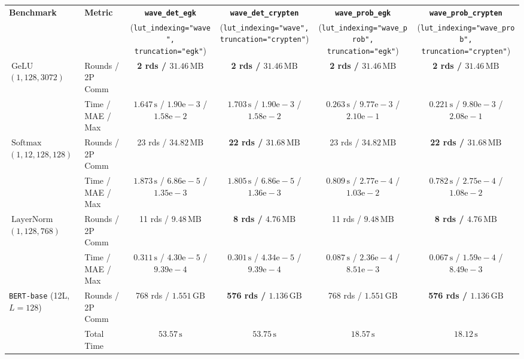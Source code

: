 \begin{tabular}{@{}llcccc@{}}
\toprule
\textbf{Benchmark} & \textbf{Metric} & \textbf{\texttt{wave\_det\_egk}} & \textbf{\texttt{wave\_det\_crypten}} & \textbf{\texttt{wave\_prob\_egk}} & \textbf{\texttt{wave\_prob\_crypten}} \\
 & & (\texttt{lut\_indexing="wave", truncation="egk"}) & (\texttt{lut\_indexing="wave", truncation="crypten"}) & (\texttt{lut\_indexing="wave\_prob", truncation="egk"}) & (\texttt{lut\_indexing="wave\_prob", truncation="crypten"}) \\
\midrule
\multirow{2}{*}{$\operatorname{GeLU}$ $(1, 128, 3072)$}
 & Rounds / 2P Comm & \textbf{2 rds / $31.46\,\text{MB}$} & \textbf{2 rds / $31.46\,\text{MB}$} & \textbf{2 rds / $31.46\,\text{MB}$} & \textbf{2 rds / $31.46\,\text{MB}$} \\
 & Time / MAE / Max & $1.647\,\text{s}$ / $1.90\text{e}-3$ / $1.58\text{e}-2$ & $1.703\,\text{s}$ / $1.90\text{e}-3$ / $1.58\text{e}-2$ & $0.263\,\text{s}$ / $9.77\text{e}-3$ / $2.10\text{e}-1$ & $0.221\,\text{s}$ / $9.80\text{e}-3$ / $2.08\text{e}-1$ \\
\midrule
\multirow{2}{*}{$\operatorname{Softmax}$ $(1, 12, 128, 128)$}
 & Rounds / 2P Comm & 23 rds / $34.82\,\text{MB}$ & \textbf{22 rds / $31.68\,\text{MB}$} & 23 rds / $34.82\,\text{MB}$ & \textbf{22 rds / $31.68\,\text{MB}$} \\
 & Time / MAE / Max & $1.873\,\text{s}$ / $6.86\text{e}-5$ / $1.35\text{e}-3$ & $1.805\,\text{s}$ / $6.86\text{e}-5$ / $1.36\text{e}-3$ & $0.809\,\text{s}$ / $2.77\text{e}-4$ / $1.03\text{e}-2$ & $0.782\,\text{s}$ / $2.75\text{e}-4$ / $1.08\text{e}-2$ \\
\midrule
\multirow{2}{*}{$\operatorname{LayerNorm}$ $(1, 128, 768)$}
 & Rounds / 2P Comm & 11 rds / $9.48\,\text{MB}$ & \textbf{8 rds / $4.76\,\text{MB}$} & 11 rds / $9.48\,\text{MB}$ & \textbf{8 rds / $4.76\,\text{MB}$} \\
 & Time / MAE / Max & $0.311\,\text{s}$ / $4.30\text{e}-5$ / $9.39\text{e}-4$ & $0.301\,\text{s}$ / $4.34\text{e}-5$ / $9.39\text{e}-4$ & $0.087\,\text{s}$ / $2.36\text{e}-4$ / $8.51\text{e}-3$ & $0.067\,\text{s}$ / $1.59\text{e}-4$ / $8.49\text{e}-3$ \\
\midrule
\multirow{3}{*}{\texttt{BERT-base} (12L, $L=128$)}
 & Rounds / 2P Comm & 768 rds / $1.551\,\text{GB}$ & \textbf{576 rds / $1.136\,\text{GB}$} & 768 rds / $1.551\,\text{GB}$ & \textbf{576 rds / $1.136\,\text{GB}$} \\
 & Total Time & $53.57\,\text{s}$ & $53.75\,\text{s}$ & $18.57\,\text{s}$ & \textbf{$18.12\,\text{s}$} \\

\end{tabular}
